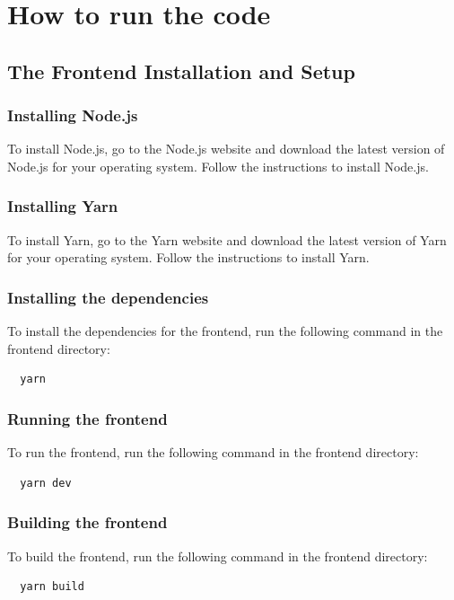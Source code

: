 \documentclass[]{final_report}
\begin{document}
\chapter{How to run the code}

\section{The Frontend Installation and Setup}

\subsection{Installing Node.js}
To install Node.js\cite{NodeJs}, go to the Node.js website and download the latest version of Node.js for your operating system. 
Follow the instructions to install Node.js.

\subsection{Installing Yarn}
To install Yarn\cite{Yarn}, go to the Yarn website and download the latest version of Yarn for your operating system.
Follow the instructions to install Yarn.

\subsection{Installing the dependencies}
To install the dependencies for the frontend, run the following command in the frontend directory:
\begin{lstlisting}
  yarn
\end{lstlisting}

\subsection{Running the frontend}
To run the frontend, run the following command in the frontend directory:
\begin{lstlisting}
  yarn dev
\end{lstlisting}

\subsection{Building the frontend}
To build the frontend, run the following command in the frontend directory:
\begin{lstlisting}
  yarn build
\end{lstlisting}
\end{document}

